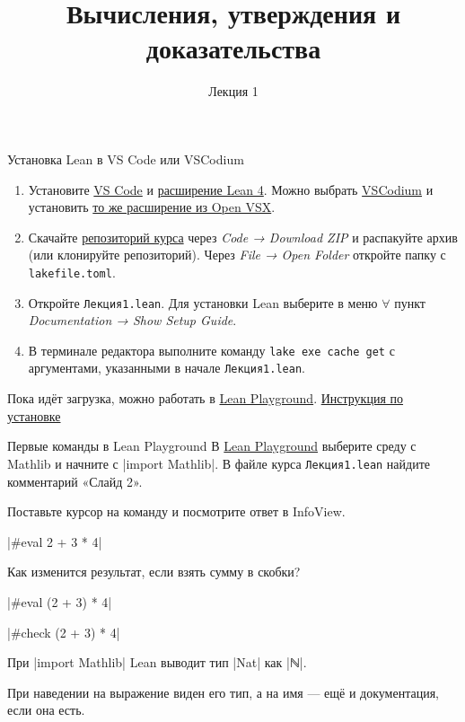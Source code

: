 \documentclass[aspectratio=169]{beamer}
\title{Вычисления, утверждения и доказательства}
\date{Лекция 1}
\begin{document}
\maketitle
\begin{frame}[fragile]{Установка Lean в VS Code или VSCodium}
\begin{enumerate}
\item Установите \href{https://code.visualstudio.com/download}{VS Code} и \href{https://marketplace.visualstudio.com/items?itemName=leanprover.lean4}{расширение Lean 4}. Можно выбрать \href{https://vscodium.com/}{VSCodium} и установить \href{https://open-vsx.org/extension/leanprover/lean4}{то же расширение из Open VSX}.
\item Скачайте \href{https://github.com/alexeyr/miet-lean-course}{репозиторий курса} через \textit{Code → Download ZIP} и распакуйте архив (или клонируйте репозиторий). Через \textit{File → Open Folder} откройте папку с \texttt{lakefile.toml}.
\item Откройте \texttt{Лекция1.lean}. Для установки Lean выберите в меню \(\forall\) пункт \textit{Documentation → Show Setup Guide}.
\item В терминале редактора выполните команду \texttt{lake exe cache get} с аргументами, указанными в начале \texttt{Лекция1.lean}.
\end{enumerate}
Пока идёт загрузка, можно работать в \href{https://live.lean-lang.org/}{Lean Playground}.
\quad\href{https://lean-lang.org/install/}{Инструкция по установке}
\end{frame}

\begin{frame}[fragile]{Первые команды в Lean Playground}
В \href{https://live.lean-lang.org/}{Lean Playground} выберите среду с Mathlib и начните с \leaninline|import Mathlib|. В файле курса \texttt{Лекция1.lean} найдите комментарий «Слайд 2».

Поставьте курсор на команду и посмотрите ответ в InfoView.

\leaninline|#eval 2 + 3 * 4| \qquad {}

Как изменится результат, если взять сумму в скобки?

\leaninline|#eval (2 + 3) * 4| \qquad {}

\leaninline|#check (2 + 3) * 4| \qquad {}

При \leaninline|import Mathlib| Lean выводит тип \leaninline|Nat| как \leaninline|ℕ|.

При наведении на выражение виден его тип, а на имя — ещё и документация, если она есть.
\end{frame}
\end{document}
